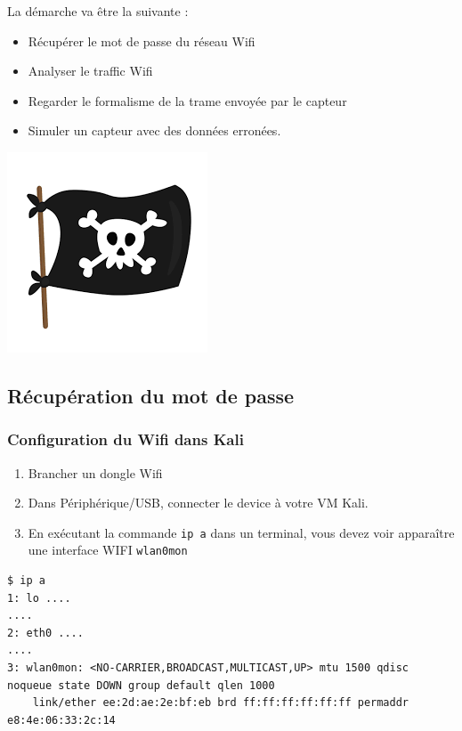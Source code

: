 \documentclass[french, 12pt]{article}%
\newcommand{\itemE}{\item[$\bullet$]}
\begin{document}
\begin{minipage}{0.55\linewidth}
La démarche va être la suivante : 
\begin{itemize}
\itemE Récupérer le mot de passe du réseau Wifi
\itemE Analyser le traffic Wifi
\itemE Regarder le formalisme de la trame envoyée par le capteur
\itemE Simuler un capteur avec des données erronées. 
\end{itemize}
\end{minipage}
\begin{minipage}{0.35\linewidth}
\begin{center}
\includegraphics[scale=0.5]{./ressource/logoHacker.png}
\end{center}
\end{minipage}





\subsection{Récupération du mot de passe}
\subsubsection{Configuration du Wifi dans Kali}

\begin{enumerate}[resume]
\item Brancher un dongle Wifi
\item Dans Périphérique/USB, connecter le device à votre VM Kali.
\item En exécutant la commande \verb?ip a? dans un terminal, vous devez voir apparaître une interface WIFI \verb?wlan0mon?
\end{enumerate}


\begin{lstlisting}[style=commande]
$ ip a                         
1: lo ....
....
2: eth0 ....
....
3: wlan0mon: <NO-CARRIER,BROADCAST,MULTICAST,UP> mtu 1500 qdisc noqueue state DOWN group default qlen 1000
    link/ether ee:2d:ae:2e:bf:eb brd ff:ff:ff:ff:ff:ff permaddr e8:4e:06:33:2c:14
\end{lstlisting}                                                                                
\end{document}
